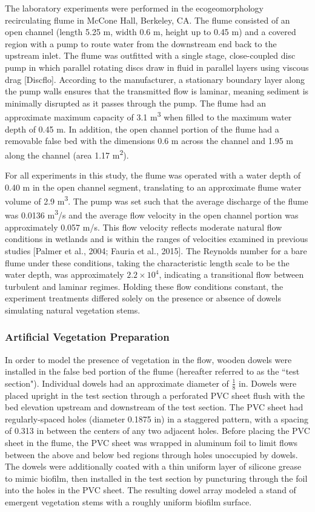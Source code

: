 \documentclass[12pt]{article}
\begin{document}
The laboratory experiments were performed in the ecogeomorphology recirculating flume in McCone Hall, Berkeley, CA. The flume consisted of an open channel (length 5.25 m, width 0.6 m, height up to 0.45 m) and a covered region with a pump to route water from the downstream end back to the upstream inlet. The flume was outfitted with a single stage, close-coupled disc pump in which parallel rotating discs draw in fluid in parallel layers using viscous drag [Discflo]. According to the manufacturer, a stationary boundary layer along the pump walls ensures that the transmitted flow is laminar, meaning sediment is minimally disrupted as it passes through the pump. The flume had an approximate maximum capacity of 3.1 m\textsuperscript{3} when filled to the maximum water depth of 0.45 m. In addition, the open channel portion of the flume had a removable false bed with the dimensions 0.6 m across the channel and 1.95 m along the channel (area 1.17 m\textsuperscript{2}).

For all experiments in this study, the flume was operated with a water depth of 0.40 m in the open channel segment, translating to an approximate flume water volume of 2.9 m\textsuperscript{3}. The pump was set such that the average discharge of the flume was 0.0136 m\textsuperscript{3}/s and the average flow velocity in the open channel portion was approximately 0.057 m/s. This flow velocity reflects moderate natural flow conditions in wetlands and is within the ranges of velocities examined in previous studies [Palmer et al., 2004; Fauria et al., 2015]. The Reynolds number for a bare flume under these conditions, taking the characteristic length scale to be the water depth, was approximately $2.2 \times 10^4$, indicating a transitional flow between turbulent and laminar regimes. Holding these flow conditions constant, the experiment treatments differed solely on the presence or absence of dowels simulating natural vegetation stems.

\subsubsection{Artificial Vegetation Preparation}

In order to model the presence of vegetation in the flow, wooden dowels were installed in the false bed portion of the flume (hereafter referred to as the ``test section"). Individual dowels had an approximate diameter of $\frac{1}{8}$ in. Dowels were placed upright in the test section through a perforated PVC sheet flush with the bed elevation upstream and downstream of the test section. The PVC sheet had regularly-spaced holes (diameter 0.1875 in) in a staggered pattern, with a spacing of 0.313 in between the centers of any two adjacent holes. Before placing the PVC sheet in the flume, the PVC sheet was wrapped in aluminum foil to limit flows between the above and below bed regions through holes unoccupied by dowels. The dowels were additionally coated with a thin uniform layer of silicone grease to mimic biofilm, then installed in the test section by puncturing through the foil into the holes in the PVC sheet. The resulting dowel array modeled a stand of emergent vegetation stems with a roughly uniform biofilm surface.
\end{document}
